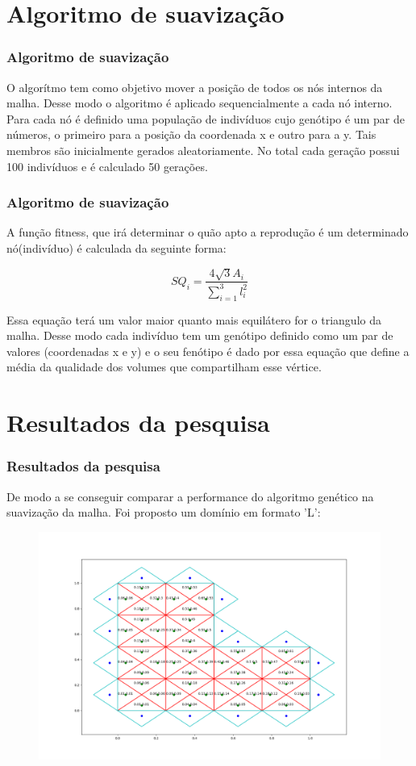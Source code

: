 \documentclass{beamer}
\begin{document}
\section{Algoritmo de suavização}
\begin{frame}
  \frametitle{Algoritmo de suavização}

  O algorítmo tem como objetivo mover a posição de todos os nós internos da malha. Desse modo o algoritmo é aplicado sequencialmente a cada nó interno. Para cada nó é definido uma população de indivíduos cujo genótipo é um par de números, o primeiro para a posição da coordenada x e outro para a y. Tais membros são inicialmente gerados aleatoriamente. No total cada geração possui 100 indivíduos e é calculado 50 gerações.

\end{frame}

\begin{frame}
  \frametitle{Algoritmo de suavização}

  A função fitness, que irá determinar o quão apto a reprodução é um determinado nó(indivíduo) é calculada da seguinte forma:

  \begin{equation}
    SQ_i = \frac{4\sqrt{3}A_i}{\sum_{i=1}^3 l_i^2}
  \end{equation}

  Essa equação terá um valor maior quanto mais equilátero for o triangulo da malha. Desse modo cada indivíduo tem um genótipo definido como um par de valores (coordenadas x e y) e o seu fenótipo é dado por essa equação que define a média da qualidade dos volumes que compartilham esse vértice.
\end{frame}

\section{Resultados da pesquisa}
\begin{frame}
  \frametitle{Resultados da pesquisa}
  De modo a se conseguir comparar a performance do algoritmo genético na suavização da malha. Foi proposto um domínio em formato 'L':

  \begin{figure}
    \includegraphics[width=0.6\linewidth]{malha_inicial.png}
  \end{figure}
\end{frame}
\end{document}

